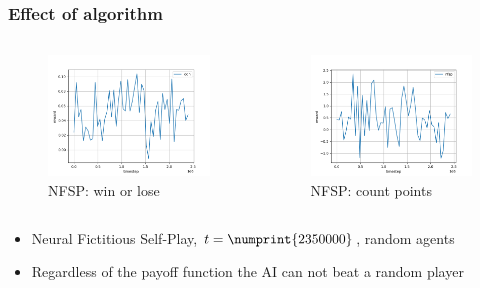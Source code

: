 \begin{frame}
\frametitle{Effect of algorithm}

\begin{columns}[t]

\begin{column}{.5\textwidth}
\begin{figure}
\includegraphics[height=.5\textheight]{nfsp.png}
\caption{NFSP: win or lose}
\end{figure}
\end{column}

\begin{column}{.5\textwidth}
\begin{figure}
\includegraphics[height=.5\textheight]{nfsp-custom-payoff.png}
\caption{NFSP: count points}
\end{figure}
\end{column}

\end{columns}

\begin{itemize}
\item Neural Fictitious Self-Play, $t = \numprint{2350000}$, random agents
\item Regardless of the payoff function the AI can not beat a random player
\end{itemize}
\end{frame}

